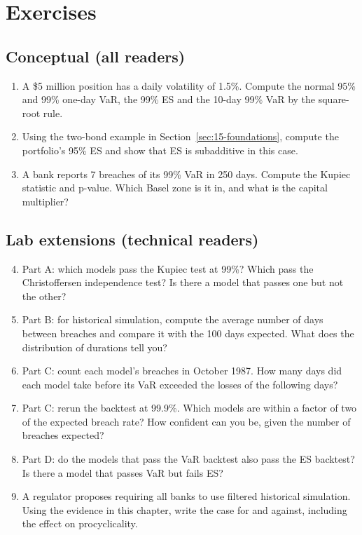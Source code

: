 \section*{Exercises}

\subsection*{Conceptual (all readers)}

\begin{enumerate}
  \item A \$5 million position has a daily volatility of 1.5\%. Compute the normal 95\% and 99\% one-day VaR, the 99\% ES and the 10-day 99\% VaR by the square-root rule.
  \item Using the two-bond example in Section~\ref{sec:15-foundations}, compute the portfolio's 95\% ES and show that ES is subadditive in this case.
  \item A bank reports 7 breaches of its 99\% VaR in 250 days. Compute the Kupiec statistic and p-value. Which Basel zone is it in, and what is the capital multiplier?
\end{enumerate}

\subsection*{Lab extensions (technical readers)}

\begin{enumerate}
  \setcounter{enumi}{3}
  \item Part A: which models pass the Kupiec test at 99\%? Which pass the Christoffersen independence test? Is there a model that passes one but not the other?
  \item Part B: for historical simulation, compute the average number of days between breaches and compare it with the 100 days expected. What does the distribution of durations tell you?
  \item Part C: count each model's breaches in October 1987. How many days did each model take before its VaR exceeded the losses of the following days?
  \item Part C: rerun the backtest at 99.9\%. Which models are within a factor of two of the expected breach rate? How confident can you be, given the number of breaches expected?
  \item Part D: do the models that pass the VaR backtest also pass the ES backtest? Is there a model that passes VaR but fails ES?
  \item A regulator proposes requiring all banks to use filtered historical simulation. Using the evidence in this chapter, write the case for and against, including the effect on procyclicality.
\end{enumerate}
